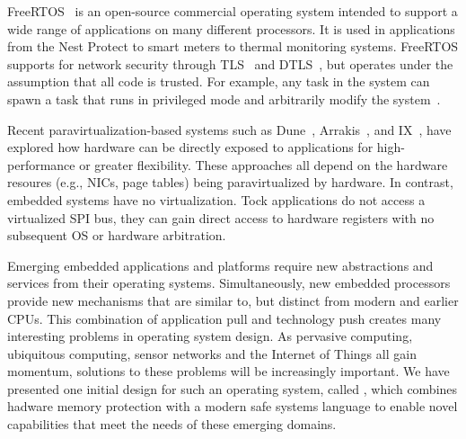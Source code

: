 FreeRTOS~\cite{freertos} is an open-source commercial operating system intended to
support a wide range of applications on many different processors. It
is used in applications from the Nest Protect to smart meters to
thermal monitoring systems. FreeRTOS supports for network security
through TLS~\cite{tls} and DTLS~\cite{dtls}, but operates under the
assumption that all code is trusted. For example, any task in the system
can spawn a task that runs in privileged mode and arbitrarily modify
the system~\cite{rtos-tasks,rtos-sec}.

Recent paravirtualization-based systems such as Dune~\cite{dune},
 Arrakis~\cite{arrakis}, and IX~\cite{ix}, have explored how hardware can
be directly exposed to applications for high-performance or greater
flexibility. These approaches all depend on the hardware resoures (e.g.,
NICs, page tables) being paravirtualized by hardware. In contrast, embedded
systems have no virtualization. Tock applications do not access a virtualized
SPI bus, they can gain direct access to hardware registers with no subsequent
OS or hardware arbitration.

Emerging embedded applications and platforms require new abstractions and
services from their operating systems. Simultaneously, new embedded processors
provide new mechanisms that are similar to, but distinct from modern and
earlier CPUs. This combination of application pull and technology push
creates many interesting problems in operating system design. As pervasive
computing, ubiquitous computing, sensor networks and the Internet of Things
all gain momentum, solutions to these problems will be increasingly 
important. We have presented one initial design for such an operating system,
called \name, which combines hadware memory protection with a modern
safe systems language to enable novel capabilities that meet the needs
of these emerging domains.
